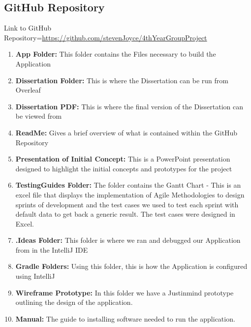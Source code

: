 \subsection{GitHub Repository}
Link to GitHub Repository={\url{https://github.com/stevenJoyce/4thYearGroupProject}}
\newline
\begin{enumerate}
    \item \textbf{App Folder:}
    \newline This folder contains the Files necessary to build the Application
    \item \textbf{Dissertation Folder:}
    \newline This is where the Dissertation can be run from Overleaf
    \item \textbf{Dissertation PDF:}
    \newline This is where the final version of the Dissertation can be viewed from
    \item \textbf{ReadMe:}
    \newline Gives a brief overview of what is contained within the GitHub Repository
    \item \textbf{Presentation of Initial Concept:}
    \newline This is a PowerPoint presentation designed to highlight the initial concepts and prototypes for the project
    \item \textbf{TestingGuides Folder:}
    \newline The folder contains the Gantt Chart -  This is an excel file that displays the implementation of Agile Methodologies to design sprints of development and the test cases we used to test each sprint with default data to get back a generic result. The test cases were designed in Excel.
    \item \textbf{.Ideas Folder:}
    \newline This folder is where we ran and debugged our Application from in the IntelliJ IDE
    \item \textbf{Gradle Folders:}
    \newline Using this folder, this is how the Application is configured using IntelliJ
    \item \textbf{Wireframe Prototype:}
    \newline In this folder we have a Justinmind prototype outlining the design of the application.
    \item \textbf{Manual:}
    \newline The guide to installing software needed to run the application.
\end{enumerate}

